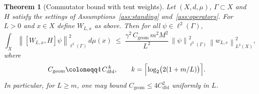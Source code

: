 \documentclass[11pt]{article}
\newtheorem{theorem}{Theorem}
\theoremstyle{definition}
\newcommand{\ellTwo}{\ell^2}
\newcommand{\norm}[1]{\left\|#1\right\|}
\begin{document}
\begin{theorem}[Commutator bound with tent weights]\label{thm:commutator}
Let $(X,d,\mu)$, $\Gamma \subset X$ and $H$ satisfy the settings of Assumptions~\ref{ass:standing}
and~\ref{ass:operators}.
For $L>0$ and $x\in X$ define $W_{L,x}$ as above. Then for all $\psi\in\ellTwo(\Gamma)$,
\begin{equation}\label{eq:commutator}
  \int_X \norm{[W_{L,x},H]\psi}_{\ellTwo(\Gamma)}^2\,d\mu(x)
  \;\le\;
  \frac{\gamma^2\,C_{\mathrm{geom}}\,m^2M^2}{L^2}\,
  \norm{\psi}_{\ellTwo(\Gamma)}^2\,\norm{w_{L,e}}_{L^2(X)}^2,
\end{equation}
where
\[
  C_{\mathrm{geom}}\coloneqq 4\,C_{\mathrm{dbl}}^{\,k},
  \qquad
  k=\Bigl\lceil\log_2\bigl(2(1+m/L)\bigr)\Bigr\rceil.
\]
In particular, for $L\ge m$, one may bound $C_{\mathrm{geom}}\le 4C_{\mathrm{dbl}}^2$ uniformly in $L$.
\end{theorem}
\end{document}

